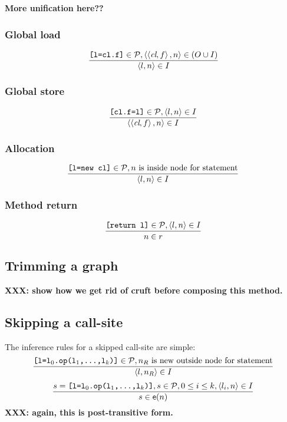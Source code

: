 \documentclass[11pt,notitlepage]{article}
\newcommand{\bigvar}[1]{\ensuremath{\text{\it #1}}}
\newcommand{\func}[1]{\ensuremath{\text{\sffamily #1}}}
\begin{document}
\textbf{More unification here??}

\subsubsection{Global load}

\begin{displaymath}
\dfrac
{\text{\tt [l=cl.f]}\in\mathcal{P},
 \tuple{\tuple{\bigvar{cl},f},n}\in (O\cup I) }
{\tuple{l,n}\in I}
\end{displaymath}

\subsubsection{Global store}

\begin{displaymath}
\dfrac
{\text{\tt [cl.f=l]}\in\mathcal{P},
 \tuple{l,n}\in I}
{\tuple{\tuple{\bigvar{cl},f},n}\in I}
\end{displaymath}

\subsubsection{Allocation}

\begin{displaymath}
\dfrac
{\text{\tt [l=new cl]}\in\mathcal{P},
 n \text{ is inside node for statement} }
{\left\langle l,n \right\rangle\in I}
\end{displaymath}

\subsubsection{Method return}

\begin{displaymath}
\dfrac
{\text{\tt [return l]}\in\mathcal{P},
 \left\langle l,n \right\rangle\in I}
{n\in r}
\end{displaymath}

\subsection{Trimming a graph}
\textbf{XXX: show how we get rid of cruft before composing this method.}

\subsection{Skipping a call-site}
The inference rules for a skipped call-site are simple:
\begin{displaymath}
\dfrac
{\text{\tt [l=l$_0$.op(l$_1$,\ldots,l$_k$)]}\in\mathcal{P},
 n_R \text{ is new outside node for statement} }
{\left\langle l,n_R \right\rangle\in I}
\end{displaymath}
\begin{displaymath}
\dfrac
{s=\text{\tt [l=l$_0$.op(l$_1$,\ldots,l$_k$)]}, s\in\mathcal{P},
 0\leq i\leq k,
 \tuple{l_i,n}\in I}
{s \in \func{e}(n) }
\end{displaymath}
\textbf{XXX: again, this is post-transitive form.}
\end{document}
